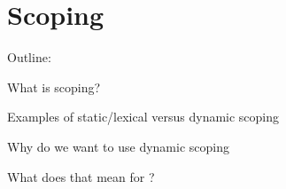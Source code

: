 \section{Scoping}

Outline:

\begin{dlist}
\item What is scoping?
\item Examples of static/lexical versus dynamic scoping
\item Why do we want to use dynamic scoping
\item What does that mean for \productname?
\end{dlist}
